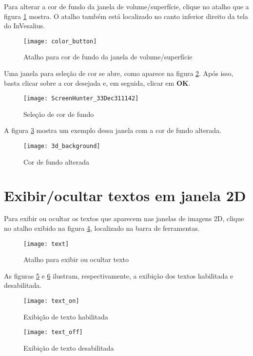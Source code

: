 Para alterar a cor de fundo da janela de volume/superfície, clique no atalho que a figura
\ref{fig:button_select_color_2} mostra. O atalho também está localizado no canto inferior
direito da tela do InVesalius.

\begin{figure}[!htb]
\centering
\texttt{[image: color\_button]}
\caption{Atalho para cor de fundo da janela de volume/superfície}
\label{fig:button_select_color_2}
\end{figure}

Uma janela para seleção de cor se abre, como aparece na figura \ref{fig:color_window_background}.
Após isso, basta clicar sobre a cor desejada e, em seguida, clicar em \textbf{OK}.

\begin{figure}[!htb]
\centering
\texttt{[image: ScreenHunter\_33Dec311142]}
\caption{Seleção de cor de fundo}
\label{fig:color_window_background}
\end{figure}

A figura \ref{fig:background_color} mostra um exemplo dessa janela com a cor de fundo alterada.

\begin{figure}[!htb]
\centering
\texttt{[image: 3d\_background]}
\caption{Cor de fundo alterada}
\label{fig:background_color}
\end{figure}

\newpage

\section{Exibir/ocultar textos em janela 2D}

Para exibir ou ocultar os textos que aparecem nas janelas de imagens 2D, clique no atalho
exibido na figura \ref{fig:text}, localizado na barra de ferramentas.

\begin{figure}[!htb]
\centering
\texttt{[image: text]}
\caption{Atalho para exibir ou ocultar texto}
\label{fig:text}
\end{figure}

As figuras \ref{fig:text_on} e \ref{fig:text_off} ilustram, respectivamente, a exibição
dos textos habilitada e desabilitada.

\begin{figure}[!htb]
\centering
\texttt{[image: text\_on]}
\caption{Exibição de texto habilitada}
\label{fig:text_on}
\end{figure}

\begin{figure}[!htb]
\centering
\texttt{[image: text\_off]}
\caption{Exibição de texto desabilitada}
\label{fig:text_off}
\end{figure}

